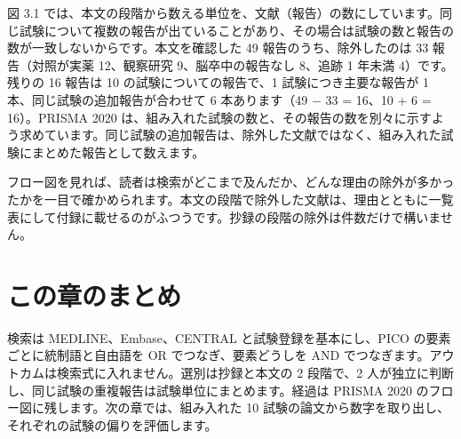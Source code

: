 図 3.1 では、本文の段階から数える単位を、文献（報告）の数にしています。同じ試験について複数の報告が出ていることがあり、その場合は試験の数と報告の数が一致しないからです。本文を確認した 49 報告のうち、除外したのは 33 報告（対照が実薬 12、観察研究 9、脳卒中の報告なし 8、追跡 1 年未満 4）です。残りの 16 報告は 10 の試験についての報告で、1 試験につき主要な報告が 1 本、同じ試験の追加報告が合わせて 6 本あります（49 − 33 = 16、10 + 6 = 16）。PRISMA 2020 は、組み入れた試験の数と、その報告の数を別々に示すよう求めています。同じ試験の追加報告は、除外した文献ではなく、組み入れた試験にまとめた報告として数えます。

フロー図を見れば、読者は検索がどこまで及んだか、どんな理由の除外が多かったかを一目で確かめられます。本文の段階で除外した文献は、理由とともに一覧表にして付録に載せるのがふつうです。抄録の段階の除外は件数だけで構いません。

\section{この章のまとめ}
\label{sec:03-6}

検索は MEDLINE、Embase、CENTRAL と試験登録を基本にし、PICO の要素ごとに統制語と自由語を OR でつなぎ、要素どうしを AND でつなぎます。アウトカムは検索式に入れません。選別は抄録と本文の 2 段階で、2 人が独立に判断し、同じ試験の重複報告は試験単位にまとめます。経過は PRISMA 2020 のフロー図に残します。次の章では、組み入れた 10 試験の論文から数字を取り出し、それぞれの試験の偏りを評価します。

